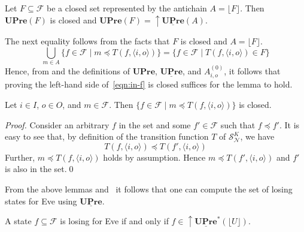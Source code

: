 \documentclass[runningheads,a4paper,draft]{llncs}
\newcommand{\upre}{\mathbf{UPre}}
\newcommand{\eve}{Eve\xspace}
\newcommand{\calF}{\mathcal{F}}
\newcommand{\calN}{\mathcal{N}}
\newcommand{\calS}{\mathcal{S}}
\newcommand{\closeup}[1]{\mathrm{\uparrow} #1}
\begin{document}
\begin{lemma}\label{lem:uupre}
  Let $F \subseteq \calF$ be a closed set represented by the antichain $A =
  \lfloor F \rfloor$. Then $\upre(F)$ is closed and
  \(
    \upre(F) = \closeup{\underline{\upre}(A)}.
  \)
\end{lemma}
The next equality follows from the facts that
$F$ is closed and $A = \lfloor F \rfloor$.
\begin{equation}\label{eqn:in-f}
  \bigcup_{m \in A} \{ f \in \calF \mid m \preceq T(f, \langle i,o \rangle)
  \}
  =
  \{f \in \calF \mid T(f,\langle i, o \rangle) \in F\}
\end{equation}
Hence, from  and the definitions of $\upre$,
$\underline{\upre}$, and $A^{(0)}_{i,o}$, it follows that proving
the left-hand side of~\eqref{eqn:in-f} is closed suffices for the lemma to
hold.
\begin{lemma}\label{lem:closed-pre}
  Let $i \in I$, $o \in O$, and $m \in \calF$.  Then $\{f \in \calF \mid m
  \preceq T(f, \langle i,o \rangle) \}$ is closed.
\end{lemma}
\begin{proof}
  Consider an arbitrary $f$ in the set and some $f' \in \calF$ such that $f
  \preceq f'$. It is easy to see that, by definition of the transition
  function $T$ of $\calS^K_\calN$, we have 
  \[ 
    T(f,\langle i, o \rangle) \preceq T(f',\langle i, o \rangle)
  \]
  Further, $m \preceq T(f,\langle i, o \rangle)$ holds by assumption. Hence
  \(m \preceq T(f', \langle i, o \rangle)\) and $f'$ is also in the set.\qed
\end{proof}

From the above lemmas and~ it follows that one can compute the set of
losing states for \eve using $\underline{\upre}$.
\begin{theorem}
  A state $f \subseteq \calF$ is losing for \eve if and only if $f \in
  \closeup{\underline{\upre}^*(\lfloor U \rfloor)}$.
\end{theorem}
\end{document}
